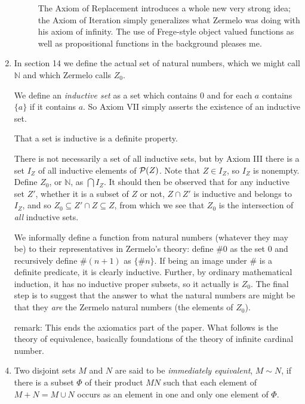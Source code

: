 \documentclass[12pt]{article}
\begin{document}
\begin{enumerate}
\begin{description}
The Axiom of Replacement introduces a whole new very strong idea;  the Axiom of Iteration simply generalizes what Zermelo was doing with his axiom of infinity.  The use of Frege-style object valued functions as well as propositional functions in the background pleases me.

\end{description}

\item In section 14 we define the actual set of natural numbers, which we might call $\mathbb N$ and which Zermelo calls $Z_0$.

We define an {\em inductive set\/} as a set which contains 0 and for each $a$ contains $\{a\}$ if it contains $a$.  So Axiom VII simply asserts the existence of
an inductive set.

That a set is inductive is a definite property.

There is not necessarily a set of all inductive sets, but by Axiom III there is a set $I_Z$ of all inductive elements of ${\cal P}(Z)$.  Note that $Z \in I_Z$, so $I_Z$ is
nonempty.  Define $Z_0$, or $\mathbb N$, as $\bigcap I_Z$.  It should then be observed that for any inductive set $Z'$, whether it is a subset of $Z$ or not,
$Z \cap Z'$ is inductive and belongs to $I_Z$, and so $Z_0 \subseteq Z'\cap Z \subseteq Z$, from which we see that $Z_0$ is the intersection of {\em all\/} inductive sets.



We informally define a function from natural numbers (whatever they may be)  to their representatives in Zermelo's theory:  define $\# 0$ as the set $0$ and recursively define
$\# (n+1)$ as $\{\# n\}$.   If being an image under $\#$ is a definite predicate, it is clearly inductive.  Further, by ordinary mathematical induction, it has no inductive proper subsets, so it actually is $Z_0$.  The final step is to suggest that the answer to what the natural numbers are might be that they {\em are\/} the Zermelo natural numbers (the elements of $Z_0$).


\item [remark:]  This ends the axiomatics part of the paper.  What follows is the theory of equivalence, basically foundations of the theory of infinite cardinal number.

\item  Two disjoint sets $M$ and $N$ are said to be {\em immediately equivalent\/}, $M \sim N$, if there is a subset $\Phi$ of their product $MN$ such that each element of
$M+N = M\cup N$ occurs as an element in one and only one element of $\Phi$.


\end{enumerate}
\end{document}
